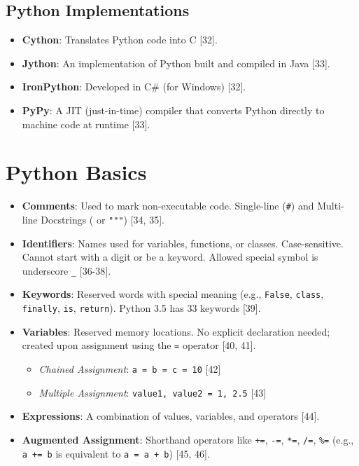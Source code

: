 \documentclass[
  letterpaper,
  DIV=11,
  numbers=noendperiod]{scrreprt}
\providecommand{\tightlist}{%
  \setlength{\itemsep}{0pt}\setlength{\parskip}{0pt}}
\begin{document}
\subsection{Python Implementations}\label{python-implementations}

\begin{itemize}
\tightlist
\item
  \textbf{Cython}: Translates Python code into C {[}32{]}.
\item
  \textbf{Jython}: An implementation of Python built and compiled in
  Java {[}33{]}.
\item
  \textbf{IronPython}: Developed in C\# (for Windows) {[}32{]}.
\item
  \textbf{PyPy}: A JIT (just-in-time) compiler that converts Python
  directly to machine code at runtime {[}33{]}.
\end{itemize}

\section{Python Basics}\label{python-basics}

\begin{itemize}
\tightlist
\item
  \textbf{Comments}: Used to mark non-executable code. Single-line
  (\texttt{\#}) and Multi-line Docstrings
  (\texttt{\textquotesingle{}\textquotesingle{}\textquotesingle{}} or
  \texttt{"""}) {[}34, 35{]}.
\item
  \textbf{Identifiers}: Names used for variables, functions, or classes.
  Case-sensitive. Cannot start with a digit or be a keyword. Allowed
  special symbol is underscore \texttt{\_} {[}36-38{]}.
\item
  \textbf{Keywords}: Reserved words with special meaning (e.g.,
  \texttt{False}, \texttt{class}, \texttt{finally}, \texttt{is},
  \texttt{return}). Python 3.5 has 33 keywords {[}39{]}.
\item
  \textbf{Variables}: Reserved memory locations. No explicit declaration
  needed; created upon assignment using the \texttt{=} operator {[}40,
  41{]}.

  \begin{itemize}
  \tightlist
  \item
    \emph{Chained Assignment}: \texttt{a\ =\ b\ =\ c\ =\ 10} {[}42{]}
  \item
    \emph{Multiple Assignment}: \texttt{value1,\ value2\ =\ 1,\ 2.5}
    {[}43{]}
  \end{itemize}
\item
  \textbf{Expressions}: A combination of values, variables, and
  operators {[}44{]}.
\item
  \textbf{Augmented Assignment}: Shorthand operators like \texttt{+=},
  \texttt{-=}, \texttt{*=}, \texttt{/=}, \texttt{\%=} (e.g.,
  \texttt{a\ +=\ b} is equivalent to \texttt{a\ =\ a\ +\ b}) {[}45,
  46{]}.
\end{itemize}
\end{document}
